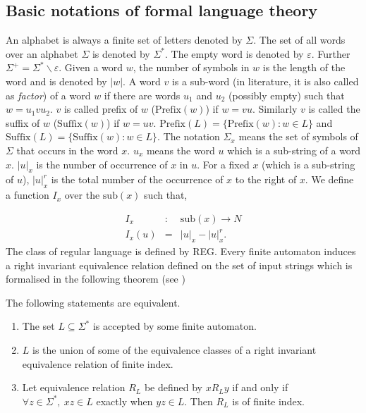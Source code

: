 \documentclass{llncs}
\newcommand{\sg}{\Sigma}
\newcommand{\ve}{\varepsilon}
\newcommand{\p}{\mathrm{Prefix}}
\newcommand{\s}{\mathrm{Suffix}}
\newcommand{\sub}{\mathrm{sub}}
\begin{document}
\subsection{Basic notations  of formal language theory}
\par An alphabet is always a finite set of letters denoted by $\sg$. The set of
all words over an alphabet $\sg$ is denoted by $\sg^*$. The empty
word is denoted by $\ve$. Further $\sg^+=\sg^*\backslash\ve$. Given
a word $w$, the number of
 symbols in $w$ is the length of the word and is denoted by $|w|$. A word $v$
  is a sub-word (in literature, it is also called as {\it factor}) of  a word
   $w$ if there are words $u_1$ and $u_2$ (possibly empty) such that $w=u_1vu_2$.
    $v$ is called prefix  of $w$ ($\p(w)$) if $w=vu$. Similarly $v$ is called the
     suffix of $w$ ($\s(w)$) if $w=uv$. $\p(L)=\{\p(w):w\in L\}$  and
     $\s(L)=\{\s(w):w\in L\}$. The notation $\sg_x$ means the set of
     symbols of $\sg$ that
occurs in the word $x$.  $u_x$ means the word $u$ which is a sub-string
 of a word $x$. $|u|_x$ is the number of occurrence of $x$ in $u$.
  For a fixed $x$ (which is a sub-string of $u$), $|u|_x^r$
  is the total number of the occurrence of $x$ to the right of $x$.
  We define a function $I_x$ over the $\sub(x)$ such that,

\begin{eqnarray*}
I_x&:&\sub(x)\longrightarrow N\\
 I_x(u)&=&|u|_x-|u|_x^r.
\end{eqnarray*}
The class of regular language is defined by REG. Every finite automaton
induces a right invariant equivalence relation defined on the set of input
 strings which is formalised in the following theorem (see \cite{HMU})

\begin{theorem}
The following statements are equivalent.
\begin{enumerate}
\item The set $L\subseteq\sg^*$ is accepted by some finite automaton.
\item $L$ is the union of some of the equivalence classes of a right
invariant equivalence relation of finite index.
\item Let equivalence relation $R_L$ be defined by $xR_Ly$ if and only if
 $\forall z\in\sg^*,~xz\in L$ exactly when $yz\in L$. Then $R_L$ is of finite index.
\end{enumerate}
\end{theorem}
\end{document}
